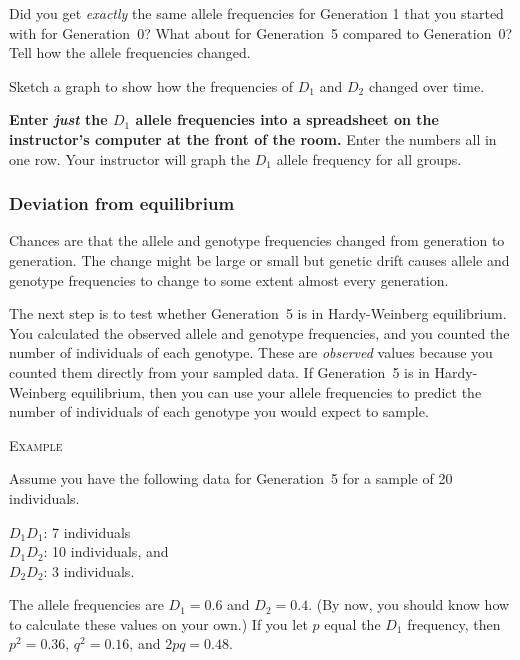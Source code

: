 \documentclass[12pt]{exam}
\newcommand{\allele}[1]{$#1$}
\begin{document}
\begin{questions}
	
\question
Did you get \emph{exactly} the same allele frequencies for
Generation 1 that you started with for Generation~0? What about for 
Generation~5 compared to Generation~0? Tell how the allele frequencies changed. 

\vspace*{6\baselineskip}


\question
Sketch a graph to show how the frequencies of \allele{D_1} and \allele{D_2} changed over time.

\vspace*{18\baselineskip}


\textbf{Enter \emph{just} the \allele{D_1} allele frequencies into a spreadsheet on the instructor's
computer at the front of the room.}  Enter the numbers all 
in one row. Your instructor will graph the \allele{D_1} allele frequency for 
all groups.

\subsubsection*{Deviation from equilibrium}

Chances are that the allele and genotype frequencies changed from generation to 
generation. The change might be large or small but genetic drift causes allele 
and genotype frequencies to change to some extent almost every generation.

The next step is to test whether Generation~5 is in Hardy-Weinberg equilibrium. 
You calculated the observed allele and genotype frequencies, and you counted the 
number of individuals of each genotype. These are \emph{observed} values because 
you counted them directly from your sampled data.  If Generation~5 is in 
Hardy-Weinberg equilibrium, then you can use your allele frequencies to predict 
the number of individuals of each genotype you would expect to sample. \bigskip

\textsc{Example}

\medskip

Assume you have the following data for Generation~5 for a sample of 20 individuals.

$D_1D_1$: 7 individuals  \\
$D_1D_2$: 10 individuals, and\\
$D_2D_2$: 3 individuals.

The allele frequencies are $D_1 = 0.6$ and $D_2 = 0.4$. (By now, you should 
know how to calculate these values on your own.) If you let $p$ equal the $D_1$ 
frequency, then $p^2 = 0.36$, $q^2 = 0.16$, and $2pq = 0.48$.


\end{questions}
\end{document}

